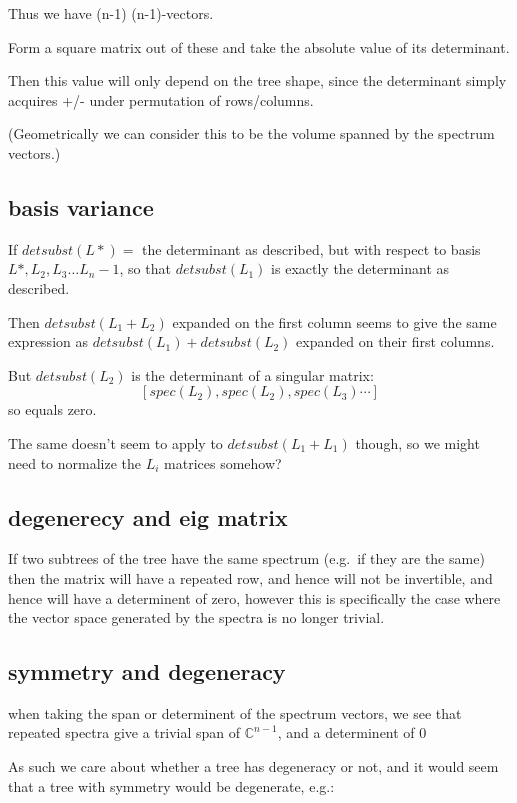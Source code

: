 \documentclass{report}
\begin{document}
Thus we have (n-1) (n-1)-vectors.

Form a square matrix out of these and take the absolute value of its
determinant.

Then this value will only depend on the tree shape, since the determinant simply acquires +/- under permutation of rows/columns.

(Geometrically we can consider this to be the volume spanned by the spectrum vectors.)



\subsection{basis variance}

If $detsubst(L*) =$ the determinant as described, but with respect to basis
$L*, L_2, L_3\ldots L_n-1$, so that $detsubst(L_1)$ is exactly the
determinant as described.

Then $detsubst(L_1 + L_2)$ expanded on the first column seems to give the same
expression as $detsubst(L_1) + detsubst(L_2)$ expanded on their first columns.

But $detsubst(L_2)$ is the determinant of a singular matrix:
\[[spec(L_2), spec(L_2), spec(L_3)\cdots]\]
so equals zero.

The same doesn't seem to apply to $detsubst(L_1 + L_1)$ though, so we might
need to normalize the $L_i$ matrices somehow?



\subsection{degenerecy and eig matrix}

If two subtrees of the tree have the same spectrum (e.g.\ if they are the same)
then the matrix will have a repeated row, and hence will not be invertible, and
hence will have a determinent of zero, however this is specifically the case
where the vector space generated by the spectra is no longer trivial.

\subsection{symmetry and degeneracy}

when taking the span or determinent of the spectrum vectors, we see that
repeated spectra give a trivial span of $\mathds{C}^{n-1}$, and a determinent of 0

As such we care about whether a tree has degeneracy or not, and it would seem
that a tree with symmetry would be degenerate, e.g.:
\end{document}
